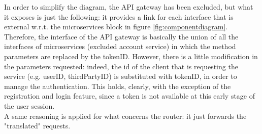 In order to simplify the diagram, the API gateway has been excluded, but what it exposes is just the following: it provides a link for each
interface that is external w.r.t. the microservices block in figure \ref{fig:componentdiagram}. Therefore, the interface of the API 
gateway is basically the union of all the interfaces of microservices (excluded account service) in which the method parameters 
are replaced by the tokenID. However, there is a little modification in the parameters requested: indeed, the id of the client 
that is requesting the service (e.g. userID, thirdPartyID) is substituted with tokenID, in order to manage the authentication. 
This holds, clearly, with the exception of the registration and login feature, since a token 
is not available at this early stage of the user session. \\ 
A same reasoning is applied for what concerns the router: it just forwards the "translated" requests.